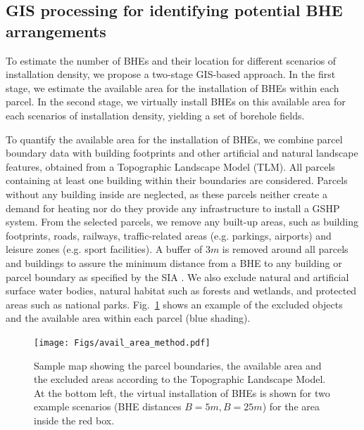 \subsection{GIS processing for identifying potential BHE arrangements}
\label{GIS}

To estimate the number of BHEs and their location for different scenarios of installation density, we propose a two-stage GIS-based approach. 
In the first stage, we estimate the available area for the installation of BHEs within each parcel. 
In the second stage, we virtually install BHEs on this available area for each scenarios of installation density, yielding a set of borehole fields. 

To quantify the available area for the installation of BHEs, we combine parcel boundary data with building footprints and other artificial and natural landscape features, obtained from a Topographic Landscape Model (TLM). 
All parcels containing at least one building within their boundaries are considered. 
Parcels without any building inside are neglected, as these parcels neither create a demand for heating nor do they provide any infrastructure to install a GSHP system. 
From the selected parcels, we remove any built-up areas, such as building footprints, roads, railways, traffic-related areas (e.g. parkings, airports) and leisure zones (e.g. sport facilities).
A buffer of $3m$ is removed around all parcels and buildings to assure the minimum distance from a BHE to any building or parcel boundary as specified by the SIA \cite{sia_sondes_2010}.
We also exclude natural and artificial surface water bodies, natural habitat such as forests and wetlands, and protected areas such as national parks.
Fig.~\ref{fig:avail_area_method} shows an example of the excluded objects and the available area within each parcel (blue shading).

\begin{figure}[tb]
    \centering
    \texttt{[image: Figs/avail\_area\_method.pdf]}
    \caption{Sample map showing the parcel boundaries, the available area and the excluded areas according to the Topographic Landscape Model. At the bottom left, the virtual installation of BHEs is shown for two example scenarios (BHE distances $B = 5m, B=25m$) for the area inside the red box.}
    \label{fig:avail_area_method}
\end{figure}

